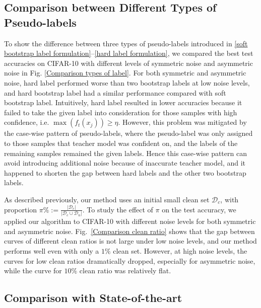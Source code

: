\documentclass[conference]{IEEEtran}
\begin{document}
\subsection{Comparison between Different Types of Pseudo-labels}
To show the difference between three types of pseudo-labels introduced in \eqref{soft bootstrap label formulation}--\eqref{hard label formulation}, we compared the best test accuracies on CIFAR-10 with different levels of symmetric noise and asymmetric noise in Fig. \ref{Comparison types of label}.
For both symmetric and asymmetric noise, hard label performed worse than two bootstrap labels at low noise levels, and hard bootstrap label had a similar performance compared with soft bootstrap label.
Intuitively, hard label resulted in lower accuracies because it failed to take the given label into consideration for those samples with high confidence, i.e. $\max(f_t(x_j))\geq\eta$. However, this problem was mitigated by the case-wise pattern of pseudo-labels, where the pseudo-label was only assigned to those samples that teacher model was confident on, and the labels of the remaining samples remained the given labels. Hence this case-wise pattern can avoid introducing additional noise because of inaccurate teacher model, and it happened to shorten the gap between hard labels and the other two bootstrap labels.



As described previously, our method uses an initial small clean set $\mathcal{D}_c$, with proportion $\pi\%:=\frac{\vert \mathcal{D}_c \vert}{\vert \mathcal{D}_c\cup\mathcal{D}_n \vert}$. To study the effect of $\pi$ on the test accuracy, we applied our algorithm to CIFAR-10 with different noise levels for both symmetric and asymmetric noise. \mbox{Fig. \ref{Comparison clean ratio}} shows that the gap between curves of different clean ratios is not large under low noise levels, and our method performs well even with only a $1\%$ clean set. However, at high noise levels, the curves for low clean ratios dramatically dropped, especially for asymmetric noise, while the curve for $10\%$ clean ratio was relatively flat. 



\subsection{Comparison with State-of-the-art}
\end{document}
